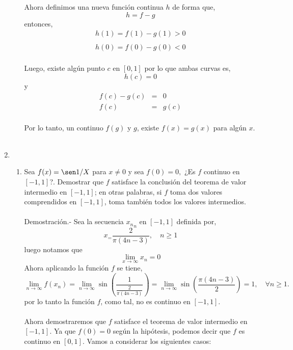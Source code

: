 \begin{enumerate}[\bfseries 1.]
\begin{enumerate}[\bfseries (a)]
	    Ahora definimos una nueva función continua $h$ de forma que,
	    $$h=f-g$$
	    entonces,
	    $$\begin{array}{l}
		h(1)=f(1)-g(1)>0\\\\
		h(0)=f(0)-g(0)<0\\
	    \end{array}$$
	    
	    Luego, existe algún punto $c$ en $[0,1]$ por lo que ambas curvas es,
	    $$h(c)=0$$
	    y 
	    $$\begin{array}{rcl}
		f(c)-g(c)&=&0\\
		f(c)&=&g(c)\\
	    \end{array}$$

	    Por lo tanto, un continuo $f(g)$ y $g$, existe $f(x)=g(x)$ para algún $x$.\\\\

    \end{enumerate}

\item 
    \begin{enumerate}[\bfseries (a)]

	\item Sea $f(x)=\sen 1/X$ para $x\neq 0$ y sea $f(0)=0,$ ¿Es $f$ continuo en $[-1,1]$?. Demostrar que $f$ satisface la conclusión del teorema de valor intermedio en $[-1,1]$; en otras palabras, si $f$ toma dos valores comprendidos en $[-1,1]$, toma también todos los valores intermedios.\\\\
	    Demostración.-\; Sea la secuencia ${x_n}_n$ en $[-1,1]$ definida por,
	    $$x_ = \dfrac{2}{\pi(4n-3)},\quad n\geq 1$$
	    luego notamos que 
	    $$\lim_{x\to \infty} x_n = 0$$
	    Ahora aplicando la función $f$ se tiene,
	    $$\lim_{n\to \infty}f(x_n) = \lim_{n\to \infty}\sin\left(\dfrac{1}{\frac{2}{\pi(4n-3)}}\right) = \lim_{n\to \infty}\sin\left(\dfrac{\pi(4n-3)}{2}\right) = 1, \quad \forall n\geq 1.$$
	    por lo tanto la función $f$, como tal, no es continuo en $[-1,1]$.\\\\
	    Ahora demostraremos que $f$ satisface el teorema de valor intermedio en $[-1,1]$. Ya que $f(0)=0$ según la hipótesis, podemos decir que $f$ es continuo en $[0,1]$. Vamos a considerar los siguientes casos:\\


\end{enumerate}
\end{enumerate}
